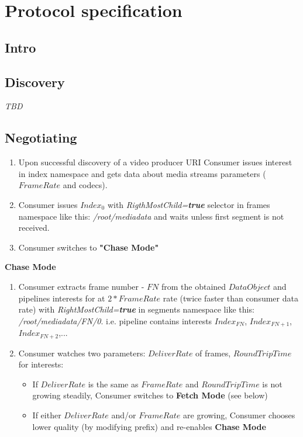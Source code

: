 \documentclass[12pt]{article}
\begin{document}
\section{Protocol specification}
\subsection{Intro}

\subsection{Discovery}
\textit{TBD}

\subsection{Negotiating}
\begin{enumerate}
\item Upon successful discovery of a video producer URI Consumer issues interest in index namespace and gets data about media streams parameters ($FrameRate$ and codecs).
\item Consumer issues $Index_{0}$ with \textit{RigthMostChild=\textbf{true}} selector in frames namespace like this: \textit{/root/mediadata} and waits unless first segment is not received.
\item Consumer switches to \textbf{"Chase Mode"}
\end{enumerate}

\textbf{Chase Mode}
\begin{enumerate}
\item Consumer extracts frame number - $FN$ from the obtained $DataObject$ and pipelines interests for  at $2*FrameRate$ rate (twice faster than consumer data rate) with \textit{RightMostChild=\textbf{true}} in segments namespace like this: \textit{/root/mediadata/FN/0}. i.e. pipeline contains interests $Index_{FN}$, $Index_{FN+1}$, $Index_{FN+2}$,...

\item Consumer watches two parameters: $DeliverRate$ of frames, $RoundTripTime$ for interests:
\begin{itemize}
\item If $DeliverRate$ is the same as $FrameRate$  and $RoundTripTime$ is not growing steadily, Consumer switches to \textbf{Fetch Mode} (see below)
\item If either $DeliverRate$ and/or $FrameRate$ are growing, Consumer chooses lower quality (by modifying prefix) and re-enables \textbf{Chase Mode}
\end{itemize}
\end{enumerate}
\end{document}
